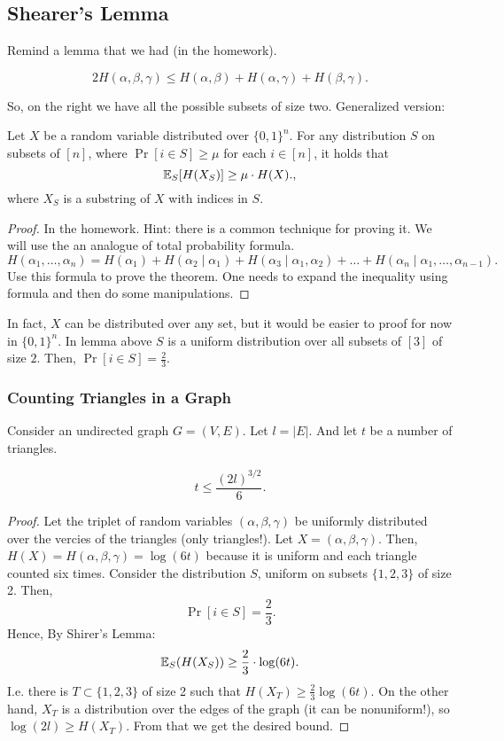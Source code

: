 \subsection{Shearer's Lemma}
Remind a lemma that we had (in the homework).
\begin{lemma}
	\[
	2 H(\alpha, \beta, \gamma) \le  H(\alpha, \beta) + H(\alpha, \gamma) + H(\beta, \gamma)
	.\] 
\end{lemma}
So, on the right we have all the possible subsets of size two.
Generalized version:
\begin{theorem}
	Let $X$ be a random variable distributed over $\{0, 1\}^{n}$.
	For any distribution $S$ on subsets of $[n]$, where $\Pr[i \in S] \geq \mu$ for each $i \in [n]$, it holds that
	 \[
		 \mathbb{E}_S[H(X_S)] \ge  \mu \cdot H(X).
	,\] where $X_S$ is a substring of  $X$ with indices in $S$. 
\end{theorem}
\begin{proof}
	In the homework.
	Hint: there is a common technique for proving it.
	We will use the an analogue of total probability formula.
	\[
		H(\alpha_1, \ldots, \alpha_n) = H(\alpha_1) + H(\alpha_2  \mid  \alpha_1) + H(\alpha_3  \mid \alpha_1, \alpha_2) + \ldots + H(\alpha_n  \mid \alpha_1, \ldots, \alpha_{n-1})
	.\] 
	Use this formula to prove the theorem.
	One needs to expand the inequality using formula and then do some manipulations.
\end{proof}
In fact, $X$ can be distributed over any set, but it would be easier to proof for now in  $\{0, 1\}^{n}$.
In lemma above $S$ is a uniform distribution over all subsets of $[3]$ of size $2$.
Then, $\Pr[i \in S] = \frac{2}{3}$.

\subsubsection{Counting Triangles in a Graph}


Consider an undirected graph $G = (V, E)$.
Let $l = |E|$.
And let  $t$ be a number of triangles.
\begin{lemma}
	\[
	t \le  \frac{(2l)^{3 / 2}}{6}
	.\] 
\end{lemma}
\begin{proof}
	Let the triplet of random variables $(\alpha, \beta, \gamma)$ be uniformly distributed over the vercies of the triangles (only triangles!).
	Let $X = (\alpha, \beta, \gamma)$.
	Then, $H(X) = H(\alpha, \beta, \gamma) = \log (6t)$ because it is uniform and each triangle counted six times.
	Consider the distribution $S$, uniform on subsets  $\{1, 2, 3\} $ of size 2.
	Then,
	\[
		\Pr[i \in S] = \frac{2}{3}
	.\] 
	Hence, By Shirer's Lemma:
	\[
		\mathbb{E}_S(H(X_S)) \ge  \frac{2}{3} \cdot \log (6t)
	.\] 
	I.e. there is $T \subset \{1, 2, 3\}  $ of size 2 such that $H(X_T) \geq \frac{2}{3} \log (6t)$.
	On the other hand, $X_T$ is a distribution over the edges of the graph (it can be nonuniform!), so  $\log (2l) \geq H(X_T)$.
	From that we get the desired bound.
\end{proof}

